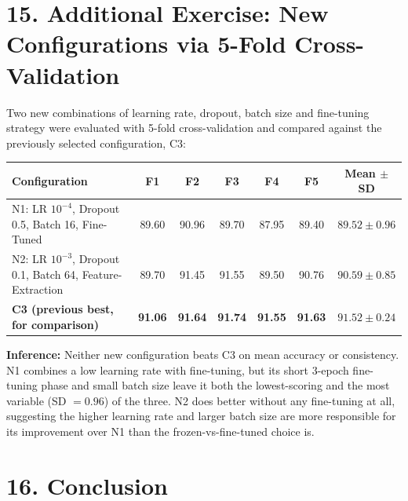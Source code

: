 \documentclass[10pt]{article}
\begin{document}
\section*{15. Additional Exercise: New Configurations via 5-Fold Cross-Validation}

Two new combinations of learning rate, dropout, batch size and
fine-tuning strategy were evaluated with 5-fold cross-validation and
compared against the previously selected configuration, C3:

\begin{center}
\small
\begin{tabular}{|p{5.2cm}|c|c|c|c|c|c|}
\hline
Configuration & F1 & F2 & F3 & F4 & F5 & Mean $\pm$ SD\\
\hline
N1: LR $10^{-4}$, Dropout 0.5, Batch 16, Fine-Tuned & 89.60 & 90.96 & 89.70 & 87.95 & 89.40 & $89.52\pm0.96$\\
N2: LR $10^{-3}$, Dropout 0.1, Batch 64, Feature-Extraction & 89.70 & 91.45 & 91.55 & 89.50 & 90.76 & $90.59\pm0.85$\\
\textbf{C3 (previous best, for comparison)} & \textbf{91.06} & \textbf{91.64} & \textbf{91.74} & \textbf{91.55} & \textbf{91.63} & $\mathbf{91.52\pm0.24}$\\
\hline
\end{tabular}
\normalsize
\end{center}

\textbf{Inference:} Neither new configuration beats C3 on mean accuracy
or consistency. N1 combines a low learning rate with fine-tuning, but
its short 3-epoch fine-tuning phase and small batch size leave it both
the lowest-scoring and the most variable (SD $=0.96$) of the three. N2
does better without any fine-tuning at all, suggesting the higher
learning rate and larger batch size are more responsible for its
improvement over N1 than the frozen-vs-fine-tuned choice is.

\section*{16. Conclusion}
\end{document}
